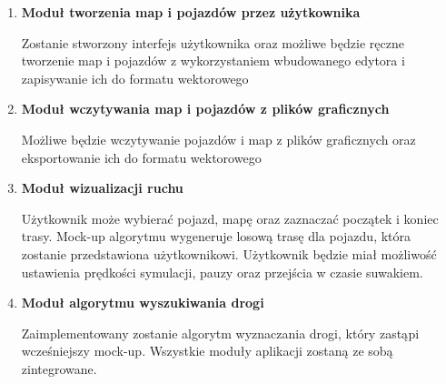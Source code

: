 \documentclass{article}
\begin{document}
\setlist{}

\begin{enumerate}
  \item \textbf{Moduł tworzenia map i pojazdów przez użytkownika}\par 
  Zostanie stworzony interfejs użytkownika oraz możliwe będzie ręczne tworzenie map i pojazdów z wykorzystaniem wbudowanego edytora i zapisywanie ich do formatu wektorowego
  \item \textbf{Moduł wczytywania map i pojazdów z plików graficznych}\par
  Możliwe będzie wczytywanie pojazdów i map z plików graficznych oraz eksportowanie ich do formatu wektorowego
  \item \textbf{Moduł wizualizacji ruchu}\par
  Użytkownik może wybierać pojazd, mapę oraz zaznaczać początek i koniec trasy. Mock-up algorytmu wygeneruje losową trasę dla pojazdu, która zostanie przedstawiona użytkownikowi. Użytkownik będzie miał możliwość ustawienia prędkości symulacji, pauzy oraz przejścia w czasie suwakiem.
  \item \textbf{Moduł algorytmu wyszukiwania drogi}\par
  Zaimplementowany zostanie algorytm wyznaczania drogi, który zastąpi wcześniejszy mock-up. Wszystkie moduły aplikacji zostaną ze sobą zintegrowane.
\end{enumerate}
\end{document}
